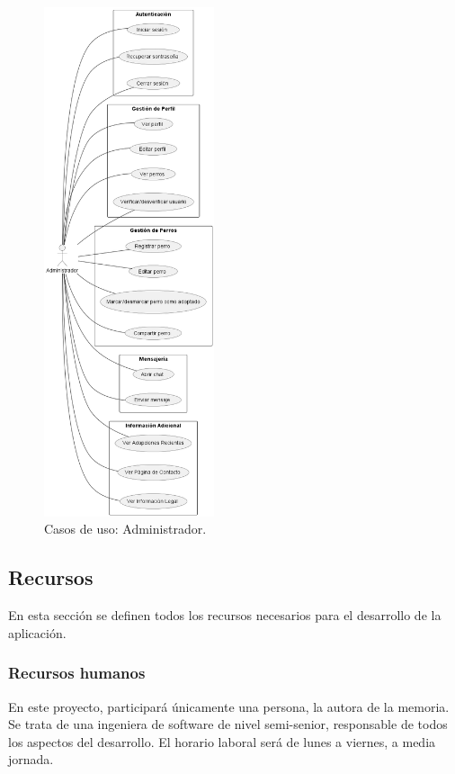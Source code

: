 \documentclass[a4paper, 12pt]{article}
\begin{document}
\begin{figure}[H]
	\begin{center}
		{\includegraphics[width=5cm]{diagram/Admin.png}\par}
		\caption{Casos de uso: Administrador.}
	\end{center}
\end{figure}





\newpage
\subsection{Recursos}

En esta sección se definen todos los recursos necesarios para el desarrollo de la aplicación.

\subsubsection{Recursos humanos}

En este proyecto, participará únicamente una persona, la autora de la memoria. Se trata de una ingeniera de software de nivel semi-senior, responsable de todos los aspectos del desarrollo. El horario laboral será de lunes a viernes, a media jornada.
\end{document}
